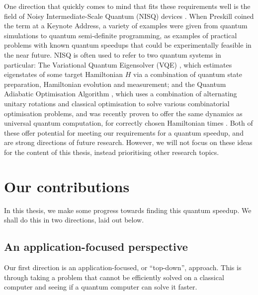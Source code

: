 One direction that quickly comes to mind that fits these requirements well is the field of Noisy Intermediate-Scale Quantum (NISQ) devices \cite{preskill2018}. When Preskill coined the term at a Keynote Address, a variety of examples were given from quantum simulations to quantum semi-definite programming, as examples of practical problems with known quantum speedups that could be experimentally feasible in the near future. NISQ is often used to refer to two quantum systems in particular: The Variational Quantum Eigensolver (VQE) \cite{peruzzo2014}, which estimates eigenstates of some target Hamiltonian $H$ via a combination of quantum state preparation, Hamiltonian evolution and measurement; and the Quantum Adiabatic Optimisation Algorithm \cite{farhi2014}, which uses a combination of alternating unitary rotations and classical optimisation to solve various combinatorial optimisation problems, and was recently proven to offer the same dynamics as universal quantum computation, for correctly chosen Hamiltonian times \cite{lloyd2018, morales2019}. Both of these offer potential for meeting our requirements for a quantum speedup, and are strong directions of future research. However, we will not focus on these ideas for the content of this thesis, instead prioritising other research topics.

\section{Our contributions}
\label{sec:contributions}

In this thesis, we make some progress towards finding this quantum speedup. We shall do this in two directions, laid out below.

\subsection{An application-focused perspective}

Our first direction is an application-focused, or ``top-down'', approach. This is through taking a problem that cannot be efficiently solved on a classical computer and seeing if a quantum computer can solve it faster.

